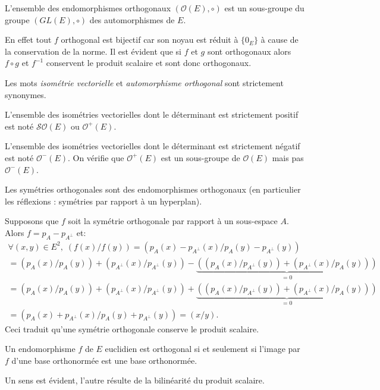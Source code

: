  
\begin{prop}
 L'ensemble des endomorphismes orthogonaux $(\mathcal O(E),\circ)$ est un sous-groupe du groupe $(GL(E),\circ)$ des automorphismes de $E$.
\end{prop}
\begin{demo}
 En effet tout $f$ orthogonal est bijectif car son noyau est réduit à $\{0_E\}$ à cause de la conservation de la norme. Il est évident que si $f$ et $g$ sont orthogonaux alors $f\circ g$ et $f^{-1}$ conservent le produit scalaire et sont donc orthogonaux.
\end{demo}
\begin{rem}
  Les mots \emph{isométrie vectorielle} et \emph{automorphisme orthogonal} sont strictement synonymes.
\end{rem}
\begin{defi}
  L'ensemble des isométries vectorielles dont le déterminant est strictement positif est noté $\mathcal{SO}(E)$ ou $\mathcal{O}^+(E)$.
\end{defi}
\begin{rem}
  L'ensemble des isométries vectorielles dont le déterminant est strictement négatif est noté $\mathcal{O}^-(E)$. On vérifie que $\mathcal{O}^+(E)$ est un sous-groupe de $\mathcal{O}(E)$ mais pas $\mathcal{O}^-(E)$.
\end{rem}
\newpage
{}
\begin{exple}
 Les symétries orthogonales sont des endomorphismes orthogonaux (en particulier les réflexions : symétries par rapport à un hyperplan).
\end{exple}
\begin{demo}
  Supposons que $f$ soit la symétrie orthogonale par rapport à un sous-espace $A$. Alors $f = p_A - p_{A^{\bot}}$ et:
  \begin{multline*}
\forall (x,y)\in E^2, \;
(f(x)/f(y)) = (p_{A}(x) - p_{A^{\bot}}(x) /p_{A}(y) - p_{A^{\bot}}(y)) \\
= (p_{A}(x) /p_{A}(y)) + (p_{A^{\bot}}(x) /p_{A^{\bot}}(y)) 
   -  \underset{ = 0}{\underbrace{\left( (p_{A}(x) /p_{A^{\bot}}(y)) + (p_{A^{\bot}}(x) /p_{A}(y))\right)}} \\ 
= (p_{A}(x) /p_{A}(y)) + (p_{A^{\bot}}(x) /p_{A^{\bot}}(y)) 
   +  \underset{ = 0}{\underbrace{\left( (p_{A}(x) /p_{A^{\bot}}(y)) + (p_{A^{\bot}}(x) /p_{A}(y))\right)}} \\ 
= (p_{A}(x) + p_{A^{\bot}}(x) /p_{A}(y) + p_{A^{\bot}}(y)) = (x/y). 
   \end{multline*}
Ceci traduit qu'une symétrie orthogonale conserve le produit scalaire.
\end{demo}
\newpage
\begin{prop}
 Un endomorphisme $f$ de $E$ euclidien est orthogonal si et seulement si l'image par $f$ d'une base orthonormée est une base orthonormée.
\end{prop}
\begin{demo}
 Un sens est évident, l'autre résulte de la bilinéarité du produit scalaire.
\end{demo}


